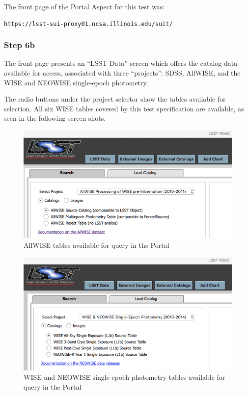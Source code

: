 \documentclass[DM,lsstdraft,STR,toc]{lsstdoc}
\begin{document}
The front page of the Portal Aspect for this test was:

\begin{center}
\texttt{https://lsst-sui-proxy01.ncsa.illinois.edu/suit/}
\end{center}

\subsubsection{Step 6b}

The front page presents an ``LSST Data'' screen which offers the catalog data available for access, associated with three ``projects'': SDSS, AllWISE, and the WISE and NEOWISE single-epoch photometry.

The radio buttons under the project selector show the tables available for selection.
All six WISE tables covered by this test specification are available, as seen in the following screen shots.

\begin{figure}
  \includegraphics[width=\linewidth]{lsp-00-00/AllWISE-table-selection.png}
  \caption{AllWISE tables available for query in the Portal}
  \label{fig:portal-allwise-sel}
\end{figure}

\begin{figure}
  \includegraphics[width=\linewidth]{lsp-00-00/Single-Epoch-table-selection.png}
  \caption{WISE and NEOWISE single-epoch photometry tables available for query in the Portal}
  \label{fig:portal-singleepoch-sel}
\end{figure}
\end{document}
